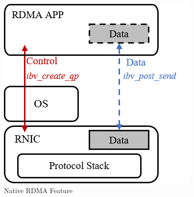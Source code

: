 \begin{figure}[!ht]
	\centering
	\includegraphics[width=0.6\linewidth]{images/rdma-feat}
	\caption{Native RDMA Feature}
	\label{fig:rdma-feat}
\end{figure}


